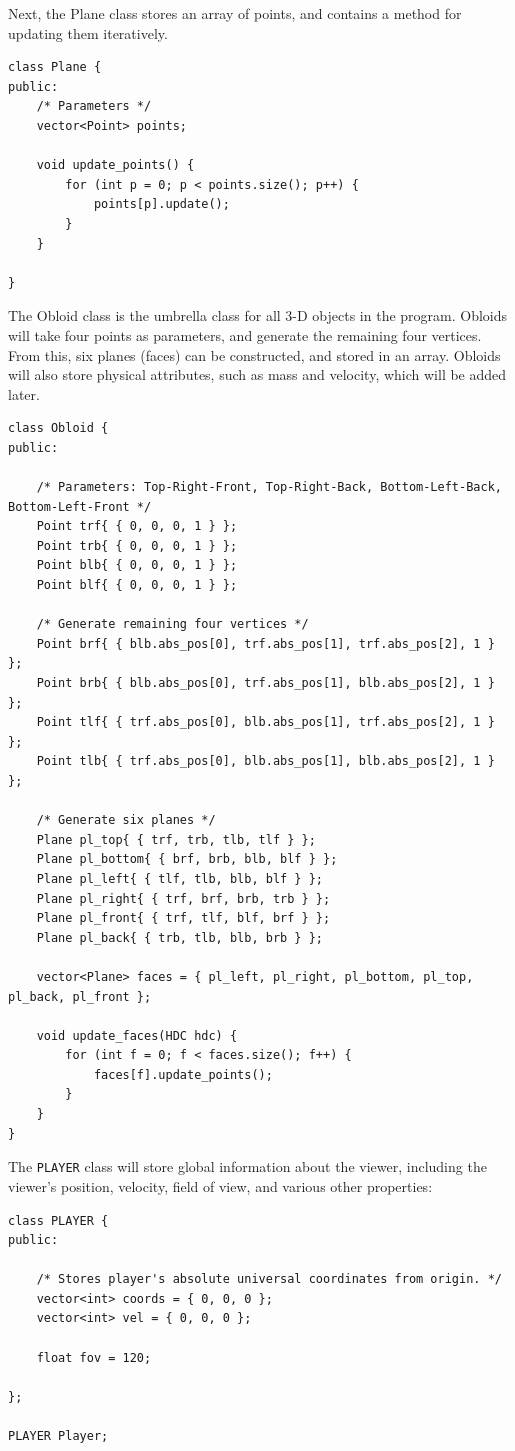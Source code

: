 \documentclass{article}
\begin{document}
Next, the Plane class stores an array of points, and contains a method for updating them iteratively. 
\begin{lstlisting}
class Plane {
public:
	/* Parameters */
	vector<Point> points;
	
	void update_points() {
		for (int p = 0; p < points.size(); p++) {
			points[p].update();
		}
	}
	
}
\end{lstlisting}
\newpage
The Obloid class is the umbrella class for all 3-D objects in the program. Obloids will take four points as parameters, and generate the remaining four vertices. From this, six planes (faces) can be constructed, and stored in an array. 
\newline
\newline
Obloids will also store physical attributes, such as mass and velocity, which will be added later.

\begin{lstlisting}
class Obloid {
public:

	/* Parameters: Top-Right-Front, Top-Right-Back, Bottom-Left-Back, Bottom-Left-Front */
	Point trf{ { 0, 0, 0, 1 } };
	Point trb{ { 0, 0, 0, 1 } };
	Point blb{ { 0, 0, 0, 1 } };
	Point blf{ { 0, 0, 0, 1 } };
	
	/* Generate remaining four vertices */
	Point brf{ { blb.abs_pos[0], trf.abs_pos[1], trf.abs_pos[2], 1 } };
	Point brb{ { blb.abs_pos[0], trf.abs_pos[1], blb.abs_pos[2], 1 } };
	Point tlf{ { trf.abs_pos[0], blb.abs_pos[1], trf.abs_pos[2], 1 } };
	Point tlb{ { trf.abs_pos[0], blb.abs_pos[1], blb.abs_pos[2], 1 } };
	
	/* Generate six planes */	
	Plane pl_top{ { trf, trb, tlb, tlf } };
	Plane pl_bottom{ { brf, brb, blb, blf } };
	Plane pl_left{ { tlf, tlb, blb, blf } };
	Plane pl_right{ { trf, brf, brb, trb } };
	Plane pl_front{ { trf, tlf, blf, brf } };
	Plane pl_back{ { trb, tlb, blb, brb } };
	
	vector<Plane> faces = { pl_left, pl_right, pl_bottom, pl_top, pl_back, pl_front };
	
	void update_faces(HDC hdc) {
		for (int f = 0; f < faces.size(); f++) {
			faces[f].update_points();
		}
	}
}
\end{lstlisting}

\newpage

The \verb|PLAYER| class will store global information about the viewer, including the viewer's position, velocity, field of view, and various other properties:

\begin{lstlisting}
class PLAYER {
public:

	/* Stores player's absolute universal coordinates from origin. */
	vector<int> coords = { 0, 0, 0 };
	vector<int> vel = { 0, 0, 0 };

	float fov = 120;	

};

PLAYER Player;
\end{lstlisting}
\end{document}

